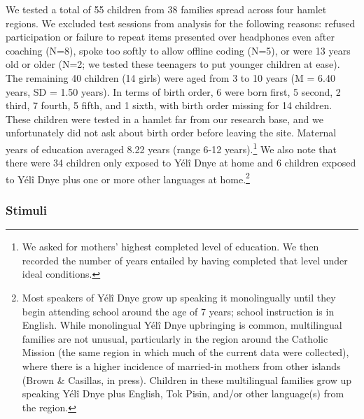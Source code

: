 \documentclass[
  american,
  ,man,floatsintext]{apa6}
\begin{document}
We tested a total of 55 children from 38 families spread across four hamlet regions. We excluded test sessions from analysis for the following reasons: refused participation or failure to repeat items presented over headphones even after coaching (N=8), spoke too softly to allow offline coding (N=5), or were 13 years old or older (N=2; we tested these teenagers to put younger children at ease). The remaining 40 children (14 girls) were aged from 3 to 10 years (M = 6.40 years, SD = 1.50 years). In terms of birth order, 6 were born first, 5 second, 2 third, 7 fourth, 5 fifth, and 1 sixth, with birth order missing for 14 children. These children were tested in a hamlet far from our research base, and we unfortunately did not ask about birth order before leaving the site. Maternal years of education averaged 8.22 years (range 6-12 years).\footnote{We asked for mothers' highest completed level of education. We then recorded the number of years entailed by having completed that level under ideal conditions.} We also note that there were 34 children only exposed to Yélî Dnye at home and 6 children exposed to Yélî Dnye plus one or more other languages at home.\footnote{Most speakers of Yélî Dnye grow up speaking it monolingually until they begin attending school around the age of 7 years; school instruction is in English. While monolingual Yélî Dnye upbringing is common, multilingual families are not unusual, particularly in the region around the Catholic Mission (the same region in which much of the current data were collected), where there is a higher incidence of married-in mothers from other islands (Brown \& Casillas, in press). Children in these multilingual families grow up speaking Yélî Dnye plus English, Tok Pisin, and/or other language(s) from the region.}

\hypertarget{stimuli}{%
\subsubsection{Stimuli}\label{stimuli}}
\end{document}
